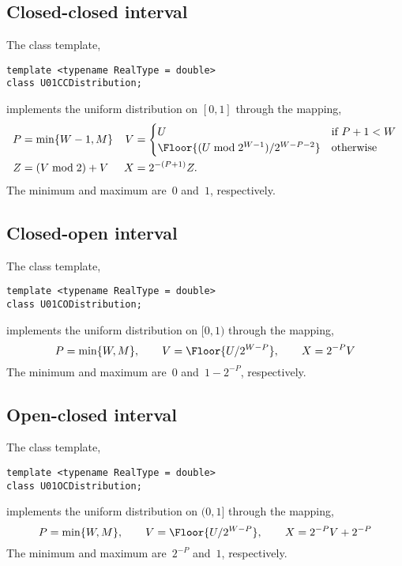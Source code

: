 \subsection{Closed-closed interval}
\label{sub:Closed-closed interval}

The class template,
\begin{verbatim}
template <typename RealType = double>
class U01CCDistribution;
\end{verbatim}
implements the uniform distribution on $[0, 1]$ through the mapping,
\begin{align*}
  P &= \min\{W - 1, M\} &
  V &= \begin{cases}
    U &\text{if } P + 1 < W \\
    \Floor{(U \bmod 2^{W - 1}) / 2^{W - P -2}} &\text{otherwise}
  \end{cases} \\
  Z &= (V \bmod 2) + V &
  X &= 2^{-(P + 1)} Z.
\end{align*}
The minimum and maximum are~$0$ and~$1$, respectively.

\subsection{Closed-open interval}
\label{sub:Closed-open interval}

The class template,
\begin{verbatim}
template <typename RealType = double>
class U01CODistribution;
\end{verbatim}
implements the uniform distribution on $[0, 1)$ through the mapping,
\begin{equation*}
  P = \min\{W, M\},\qquad
  V = \Floor{U / 2^{W - P}},\qquad
  X = 2^{-P} V
\end{equation*}
The minimum and maximum are~$0$ and~$1 - 2^{-P}$, respectively.

\subsection{Open-closed interval}
\label{sub:Open-closed interval}

The class template,
\begin{verbatim}
template <typename RealType = double>
class U01OCDistribution;
\end{verbatim}
implements the uniform distribution on $(0, 1]$ through the mapping,
\begin{equation*}
  P = \min\{W, M\},\qquad
  V = \Floor{U / 2^{W - P}},\qquad
  X = 2^{-P} V + 2^{-P}
\end{equation*}
The minimum and maximum are~$2^{-P}$ and~$1$, respectively.

